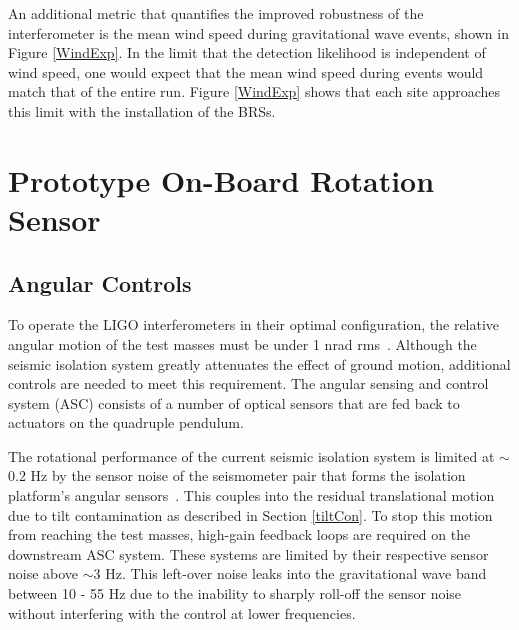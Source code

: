 \documentclass [12pt, proquest]{uwthesis}[2019]
\begin{document}
An additional metric that quantifies the improved robustness of the interferometer is the mean wind speed during gravitational wave events, shown in Figure \ref{WindExp}. In the limit that the detection likelihood is independent of wind speed, one would expect that the mean wind speed during events would match that of the entire run. Figure \ref{WindExp} shows that each site approaches this limit with the installation of the BRSs. 



\chapter{Prototype On-Board Rotation Sensor}\label{cBRS_chap}
\section{Angular Controls}\label{ASC}

To operate the LIGO interferometers in their optimal configuration, the relative angular motion of the test masses must be under 1 nrad rms~\cite{ASC}. Although the seismic isolation system greatly attenuates the effect of ground motion, additional controls are needed to meet this requirement. The angular sensing and control system (ASC) consists of a number of optical sensors that are fed back to actuators on the quadruple pendulum.~\cite{ASC}

The rotational performance of the current seismic isolation system is limited at $\sim$0.2 Hz by the sensor noise of the seismometer pair that forms the isolation platform's angular sensors~\cite{windproofing}. This couples into the residual translational motion due to tilt contamination as described in Section \ref{tiltCon}. To stop this motion from reaching the test masses, high-gain feedback loops are required on the downstream ASC system. These systems are limited by their respective sensor noise above $\sim$3 Hz. This left-over noise leaks into the gravitational wave band between 10 - 55 Hz due to the inability to sharply roll-off the sensor noise without interfering with the control at lower frequencies. 
\end{document}
